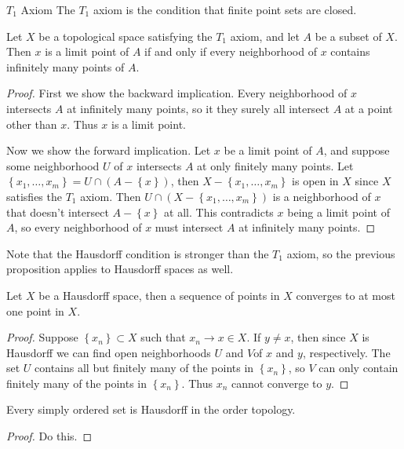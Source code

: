 \documentclass[10pt]{report}
\begin{document}
\begin{defn}{$T_1$ Axiom}{}
	The $T_1$ axiom is the condition that finite point sets are closed.
\end{defn}

\begin{prop}
	Let $X$ be a topological space satisfying the $T_1$ axiom, and let $A$ be a subset of $X$. Then $x$ is a limit point of $A$ if and only if every neighborhood of $x$ contains infinitely many points of $A$.
\end{prop}
\begin{proof}
	First we show the backward implication. Every neighborhood of $x$ intersects $A$ at infinitely many points, so it they surely all intersect $A$ at a point other than $x$. Thus $x$ is a limit point.

	Now we show the forward implication. Let $x$ be a limit point of $A$, and suppose some neighborhood $U$ of $x$ intersects $A$ at only finitely many points. Let $\left\{ x_1,\dots,x_m \right\} = U \cap (A-\left\{ x \right\})$, then $X - \left\{ x_1,\dots,x_m \right\}$ is open in $X$ since $X$ satisfies the $T_1$ axiom. Then $U \cap (X - \left\{ x_1,\dots,x_m \right\})$ is a neighborhood of $x$ that doesn't intersect $A - \left\{ x \right\}$ at all. This contradicts $x$ being a limit point of $A$, so every neighborhood of $x$ must intersect $A$ at infinitely many points.
\end{proof}

Note that the Hausdorff condition is stronger than the $T_1$ axiom, so the previous proposition applies to Hausdorff spaces as well.

\begin{prop}
	Let $X$ be a Hausdorff space, then a sequence of points in $X$ converges to at most one point in $X$.
\end{prop}
\begin{proof}
	Suppose $\left\{ x_n \right\} \subset X$ such that $x_n \to x \in X$. If $y \neq x$, then since $X$ is Hausdorff we can find open neighborhoods $U$ and $V$of $x$ and $y$, respectively. The set $U$ contains all but finitely many of the points in $\left\{ x_n \right\}$, so $V$ can only contain finitely many of the points in $\left\{ x_n \right\}$. Thus $x_n$ cannot converge to $y$.
\end{proof}

\begin{prop}
	Every simply ordered set is Hausdorff in the order topology.
\end{prop}
\begin{proof}
	{\color{red}Do this.}
\end{proof}
\end{document}
